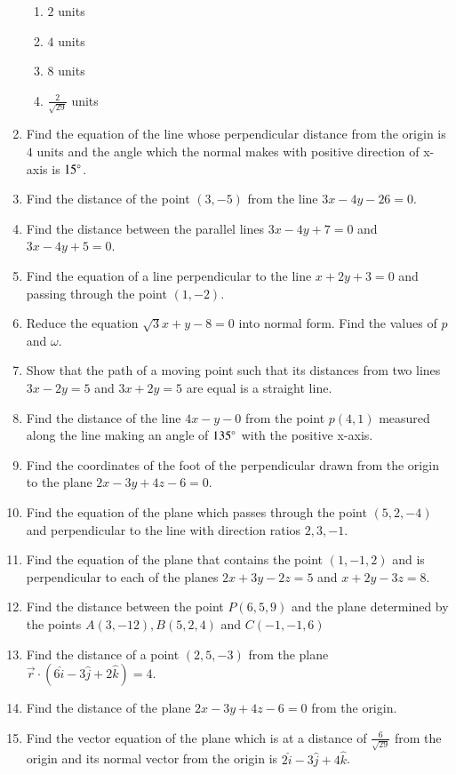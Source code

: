 \begin{enumerate}[label=\thesubsection.\arabic*, ref=\thesubsection.\theenumi]
\begin{enumerate}
\item $2$ units
\item $4$ units
\item $8$ units
\item $\frac{2}{\sqrt{29}}$ units
\end{enumerate}
\item Find the equation of the line whose perpendicular distance from the origin is $4$ units and the angle which the normal makes with positive direction of x-axis is $15\degree$.
\item Find the distance of the point $(3, -5)$ from the line $3x-4y-26=0$.
\item Find the distance between the parallel lines $3x-4y+7=0$ and $3x-4y+5=0$.
\item Find the equation of a line perpendicular to the line $x+2y+3=0$ and passing through the point $(1, -2)$.
\item Reduce the equation $\sqrt3x+y-8=0$ into normal form. Find the values of $p$ and $\omega$.
\item Show that the path of a moving point such that its distances from two lines $3x-2y=5$ and $3x+2y=5$ are equal is a straight line.
\item Find the distance of the line $4x-y-0$ from the point $p(4, 1)$ measured along the line making an angle of $135\degree$ with the positive x-axis.
\item Find the coordinates of the foot of the perpendicular drawn from the origin to the plane $2x -3y +4z -6 = 0$.
\item Find the equation of the plane which passes through the point $(5,  2,  -4)$ and perpendicular to the line with direction ratios $2,  3,  -1$.
\item Find the equation of the plane that contains the point $(1,  -1,  2)$ and is perpendicular to each of the planes $2x +3y -2z =5$ and $x +2y -3z =8$.
\item Find the distance between the point $P(6,  5,  9)$ and the plane determined by the points $A(3,  -1 2),  B( 5,  2, 4)$ and $C(-1,  -1,  6)$
\item Find the distance of a point $(2,  5,  -3)$ from the plane $\overrightarrow{r} \cdot (6\hat{i} -3\hat{j} +2\hat{k}) =4$.
\item Find the distance of the plane $2x- 3y+ 4z- 6= 0$ from the origin.
\item Find the vector equation of the plane which is at a distance of $\frac{6}{\sqrt{29}}$ from the origin and its normal vector from the origin is $2 \hat{i}- 3 \hat{j}+ 4 \hat{k}$. 

\end{enumerate}
